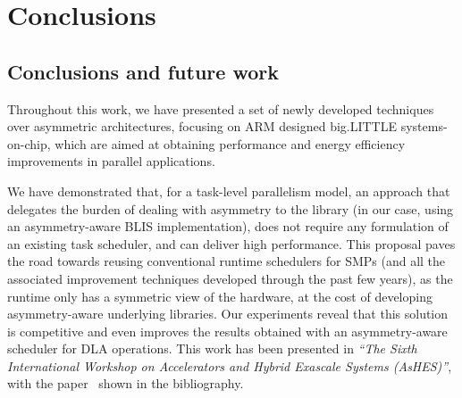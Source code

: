 \cleardoublepage

\chapter{Conclusions}
\label{ch:chapter6}

\section{Conclusions and future work}


Throughout this work, we have presented a set of newly developed techniques
over asymmetric architectures, focusing on ARM designed big.LITTLE
systems-on-chip, which are aimed at obtaining performance and energy
efficiency improvements in parallel applications.



We have demonstrated that, for a task-level parallelism model, an approach
that delegates the burden of dealing with asymmetry to the library (in our
case, using an asymmetry-aware BLIS implementation), does not require any
formulation of an existing task scheduler, and can deliver high
performance. This proposal paves the road towards reusing conventional
runtime schedulers for SMPs (and all the associated improvement techniques
developed through the past few years), as the runtime only has a symmetric
view of the hardware, at the cost of developing asymmetry-aware underlying
libraries. Our experiments reveal that this solution is competitive and
even improves the results obtained with an asymmetry-aware scheduler for
DLA operations. This work has been presented in \emph{``The Sixth
  International Workshop on Accelerators and Hybrid Exascale Systems
  (AsHES)''}, with the paper~\cite{ashes} shown in the bibliography.





